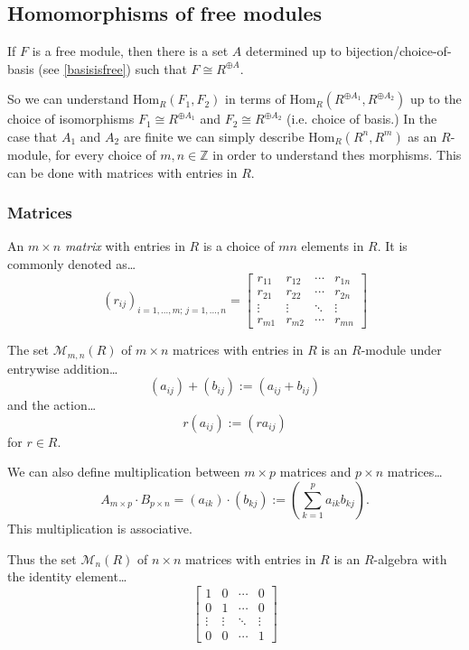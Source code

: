 \subsection{Homomorphisms of free modules}

If $F$ is a free module, then there is a set $A$ determined up to bijection/choice-of-basis (see \ref{basisisfree}) such that $F \cong R^{\oplus A}$.

So we can understand Hom$_R(F_1, F_2)$ in terms of Hom$_R(R^{\oplus A_1}, R^{\oplus A_2})$ up to the choice of isomorphisms $F_1 \cong R^{\oplus A_1}$
and $F_2 \cong R^{\oplus A_2}$ (i.e. choice of basis.) In the case that $A_1$ and $A_2$ are finite we can simply describe Hom$_R(R^n, R^m)$ as an $R$-module,
for every choice of $m,n \in \mathbb{Z}$ in order to understand thes morphisms. This can be done with matrices with entries in $R$.

\subsubsection{Matrices}\label{matrices}
An $m \times n$ \emph{matrix} with entries in $R$ is a choice of $mn$ elements in $R$. It is commonly denoted as\dots
\[
(r_{ij})_{i=1,\dots,m;\,j=1,\dots,n} =
\begin{bmatrix}
	r_{11} & r_{12} & \cdots & r_{1n} \\
	r_{21} & r_{22} & \cdots & r_{2n} \\
	\vdots & \vdots & \ddots & \vdots \\
	r_{m1} & r_{m2} & \cdots & r_{mn}
\end{bmatrix}
\]

The set $\mathcal{M}_{m,n}(R)$ of $m \times n$ matrices with entries in $R$ is an $R$-module under entrywise addition\dots
$$(a_{ij}) + (b_{ij}) := (a_{ij} + b_{ij})$$
and the action\dots
$$r(a_{ij}) := (ra_{ij})$$
for $r \in R$.

We can also define multiplication between $m \times p$ matrices and $p \times n$ matrices\dots
$$A_{m \times p} \cdot B_{p \times n} = (a_{ik}) \cdot (b_{kj}) := \left( \sum_{k=1}^{p} a_{ik} b_{kj} \right).$$
This multiplication is associative.

Thus the set $\mathcal{M}_n(R)$ of $n \times n$ matrices with entries in $R$ is an $R$-algebra with the identity element\dots
\[
\begin{bmatrix}
	1 & 0 & \cdots & 0 \\
	0 & 1 & \cdots & 0 \\
	\vdots & \vdots & \ddots & \vdots \\
	0 & 0 & \cdots & 1
\end{bmatrix}
\]

